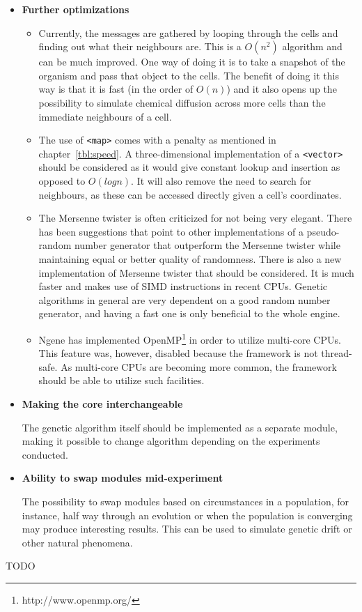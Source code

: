 \begin{itemize}
	\item\textbf{Further optimizations}
		\begin{itemize}
			\item Currently, the messages are gathered by looping through the cells and finding out what their neighbours are. This is a $O(n^{2})$ algorithm and can be much improved. One way of doing it is to take a snapshot of the organism and pass that object to the cells. The benefit of doing it this way is that it is fast (in the order of $O(n)$) and it also opens up the possibility to simulate chemical diffusion across more cells than the immediate neighbours of a cell.

			\item The use of \texttt{<map>} comes with a penalty as mentioned in chapter~\ref{tbl:speed}. A three-dimensional implementation of a \texttt{<vector>} should be considered as it would give constant lookup and insertion as opposed to $O(log n)$. It will also remove the need to search for neighbours, as these can be accessed directly given a cell's coordinates.

			\item The Mersenne twister is often criticized for not being very elegant. There has been suggestions that point to other implementations of a pseudo-random number generator that outperform the Mersenne twister while maintaining equal or better quality of randomness. There is also a new implementation of Mersenne twister that should be considered. It is much faster and makes use of SIMD instructions in recent CPUs. Genetic algorithms in general are very dependent on a good random number generator, and having a fast one is only beneficial to the whole engine.

			\item Ngene has implemented OpenMP\footnote{http://www.openmp.org/} in order to utilize multi-core CPUs. This feature was, however, disabled because the framework is not thread-safe. As multi-core CPUs are becoming more common, the framework should be able to utilize such facilities.
		\end{itemize}

	\item\textbf{Making the core interchangeable}

	The genetic algorithm itself should be implemented as a separate module, making it possible to change algorithm depending on the experiments conducted.

	\item\textbf{Ability to swap modules mid-experiment}

	The possibility to swap modules based on circumstances in a population, for instance, half way through an evolution or when the population is converging may produce interesting results. This can be used to simulate genetic drift or other natural phenomena.
\end{itemize}

TODO
